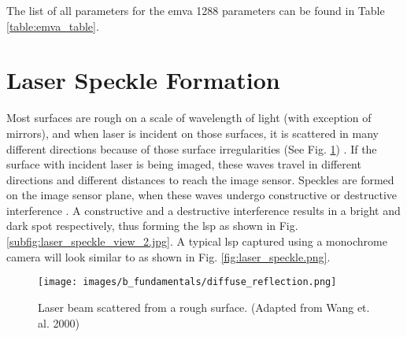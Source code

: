     \vspace{5mm}
    \nonindent The list of all parameters for the \gls{emva} 1288 parameters can be found in Table \ref{table:emva_table}.

    \section{Laser Speckle Formation}

    Most surfaces are rough on a scale of wavelength of light (with exception of mirrors), and when laser is incident on those surfaces, it is scattered in many different directions because of those surface irregularities (See Fig. \ref{fig:diffuse_reflection}) \cite{wang_2000}. If the surface with incident laser is being imaged, these waves travel in different directions and different distances to reach the image sensor. Speckles are formed on the image sensor plane, when these waves undergo constructive or destructive interference \cite{dhanasekar, goodman_book, briers}. A constructive and a destructive interference results in a bright and dark spot respectively, thus forming the \gls{lsp} as shown in Fig. \ref{subfig:laser_speckle_view_2.jpg}. A typical \gls{lsp} captured using a monochrome camera will look similar to as shown in Fig. \ref{fig:laser_speckle.png}.
    

    \begin{figure}[h]
        \centering
        \texttt{[image: images/b\_fundamentals/diffuse\_reflection.png]}
        \caption{Laser beam scattered from a rough surface. \cite{wang_2000} (Adapted from Wang et. al. 2000)}
        \label{fig:diffuse_reflection}
    \end{figure}
    

